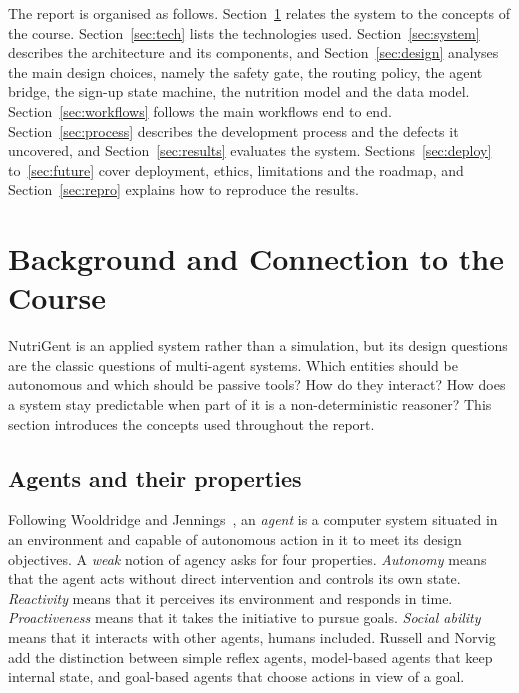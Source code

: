 \documentclass[11pt,a4paper]{article}
\begin{document}
The report is organised as follows. Section~\ref{sec:background} relates the system to the concepts of
the course. Section~\ref{sec:tech} lists the technologies used. Section~\ref{sec:system} describes the
architecture and its components, and Section~\ref{sec:design} analyses the main design choices, namely
the safety gate, the routing policy, the agent bridge, the sign-up state machine, the nutrition model
and the data model. Section~\ref{sec:workflows} follows the main workflows end to end.
Section~\ref{sec:process} describes the development process and the defects it uncovered, and
Section~\ref{sec:results} evaluates the system. Sections~\ref{sec:deploy} to~\ref{sec:future} cover
deployment, ethics, limitations and the roadmap, and Section~\ref{sec:repro} explains how to reproduce
the results.

\section{Background and Connection to the Course}\label{sec:background}

NutriGent is an applied system rather than a simulation, but its design questions are the classic
questions of multi-agent systems. Which entities should be autonomous and which should be passive
tools? How do they interact? How does a system stay predictable when part of it is a
non-deterministic reasoner? This section introduces the concepts used throughout the report.

\subsection{Agents and their properties}

Following Wooldridge and Jennings~\cite{wooldridge1995,wooldridge2009}, an \emph{agent} is a computer
system situated in an environment and capable of autonomous action in it to meet its design
objectives. A \emph{weak} notion of agency asks for four properties. \emph{Autonomy} means that the agent
acts without direct intervention and controls its own state. \emph{Reactivity} means that it perceives
its environment and responds in time. \emph{Proactiveness} means that it takes the initiative to pursue
goals. \emph{Social ability} means that it interacts with other agents, humans included. Russell and
Norvig~\cite{russell2020} add the distinction between simple reflex agents, model-based agents that
keep internal state, and goal-based agents that choose actions in view of a goal.
\end{document}
